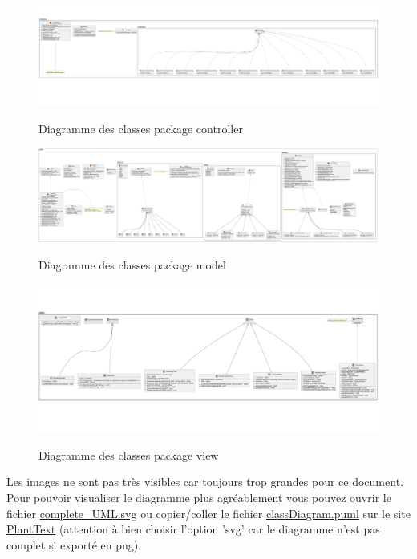 \documentclass{article}
\begin{document}
\begin{figure}[h]
    \caption{Diagramme des classes package controller}
    \centering
    \includegraphics[width=\textwidth,height=\textheight,keepaspectratio]{controller_UML}
    \label{fig:UML_complet}
\end{figure}
\pagebreak
\begin{figure}[h]
    \caption{Diagramme des classes package model}
    \centering
    \includegraphics[width=\textwidth,height=\textheight,keepaspectratio]{model_UML}
    \label{fig:UML_complet}
\end{figure}

\begin{figure}[h]
    \caption{Diagramme des classes package view}
    \centering
    \includegraphics[width=\textwidth,height=\textheight,keepaspectratio]{view_UML}
    \label{fig:UML_complet}
\end{figure}

Les images ne sont pas très visibles car toujours trop grandes pour ce document. Pour pouvoir visualiser
le diagramme plus agréablement vous pouvez ouvrir le fichier \href{run:./resources/complete_UML.svg}{complete\_UML.svg}
ou copier/coller le fichier \href{run:./classDiagram.puml}{classDiagram.puml} sur le site \href{https://www.planttext.com/}{PlantText}
(attention à bien choisir l'option 'svg' car le diagramme n'est pas complet si exporté en png).
\end{document}
